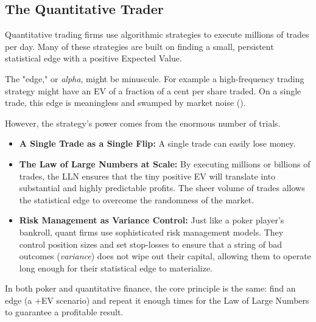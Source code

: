 \documentclass[12pt]{article}
\begin{document}
\subsection{The Quantitative Trader}
Quantitative trading firms use algorithmic strategies to execute millions of trades per day. Many of these strategies are built on finding a small, persistent statistical edge with a positive Expected Value.

The "edge," or \textit{alpha}, might be minuscule. For example a high-frequency trading strategy might have an EV of a fraction of a cent per share traded. On a single trade, this edge is meaningless and swamped by market noise ().

However, the strategy's power comes from the enormous number of trials.
\begin{itemize}
    \item \textbf{A Single Trade as a Single Flip:} A single trade can easily lose money.
    \item \textbf{The Law of Large Numbers at Scale:} By executing millions or billions of trades, the LLN ensures that the tiny positive EV will translate into substantial and highly predictable profits. The sheer volume of trades allows the statistical edge to overcome the randomness of the market.
    \item \textbf{Risk Management as Variance Control:} Just like a poker player's bankroll, quant firms use sophisticated risk management models. They control position sizes and set stop-losses to ensure that a string of bad outcomes (\textit{variance}) does not wipe out their capital, allowing them to operate long enough for their statistical edge to materialize.
\end{itemize}

In both poker and quantitative finance, the core principle is the same: find an edge (a +EV scenario) and repeat it enough times for the Law of Large Numbers to guarantee a profitable result.
\end{document}
